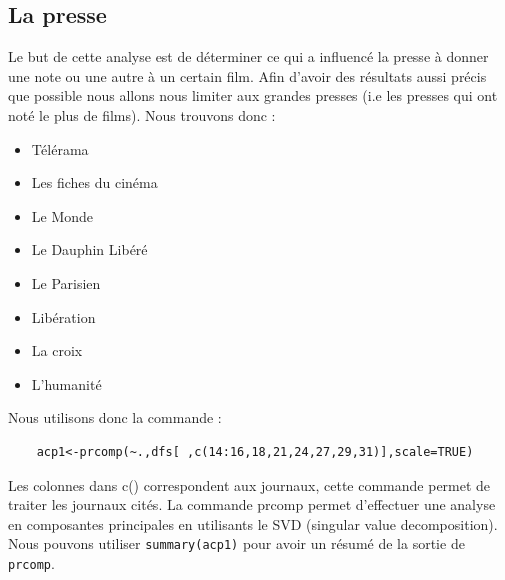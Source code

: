 \documentclass{report}
\begin{document}
\subsection{La presse}
Le but de cette analyse est de déterminer ce qui a influencé la presse à donner une note ou une autre à un
certain film. Afin d'avoir des résultats aussi précis que possible nous allons nous limiter aux grandes presses
(i.e les presses qui ont noté le plus de films). Nous trouvons donc :
\begin{itemize}
  \item Télérama
  \item Les fiches du cinéma
  \item Le Monde
  \item Le Dauphin Libéré
  \item Le Parisien
  \item Libération
  \item La croix
  \item L'humanité
\end{itemize}
Nous utilisons donc la commande :
\begin{verbatim}
    acp1<-prcomp(~.,dfs[ ,c(14:16,18,21,24,27,29,31)],scale=TRUE)
\end{verbatim}
Les colonnes dans c() correspondent aux journaux, cette commande permet de traiter les journaux cités.
La commande prcomp permet d'effectuer une analyse en composantes principales en utilisants le SVD (singular value
decomposition).\\
Nous pouvons utiliser \texttt{summary(acp1)} pour avoir un résumé de la sortie de \texttt{prcomp}.\\
\end{document}
